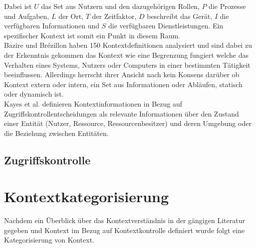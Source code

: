 Dabei ist $U$ das Set aus Nutzern und den dazugehörigen Rollen, $P$ die Prozesse und Aufgaben, $L$ der Ort, $T$ der Zeitfaktor, $D$ beschreibt das Gerät, $I$ die verfügbaren Informationen und $S$ die verfügbaren Dienstleistungen.
Ein spezifischer Kontext ist somit ein Punkt in diesem Raum.\\
Bazire und Brézillon \cite{hutchison_understanding_2005} haben 150 Kontextdefinitionen analysiert und sind dabei zu der Erkenntnis gekommen das Kontext wie eine Begrenzung fungiert welche das Verhalten eines Systems, Nutzers oder Computers in einer bestimmten Tätigkeit beeinflussen.
Allerdings herrscht ihrer Ansicht nach kein Konsens darüber ob Kontext extern oder intern, ein Set aus Informationen oder Abläufen, statisch oder dynamisch ist.\\

Kayes et al.\cite{kayes_icaf_2012} definieren Kontextinformationen in Bezug auf Zugriffskontrollentscheidungen als relevante Informationen über den Zustand einer Entität (Nutzer, Ressource, Ressourcenbesitzer) und deren Umgebung oder die Beziehung zwischen Entitäten.


\subsection{Zugriffskontrolle}
\section{Kontextkategorisierung}
Nachdem ein Überblick über das Kontextverständnis in der gängigen Literatur gegeben und Kontext im Bezug auf Kontextkontrolle definiert wurde folgt eine Kategorisierung von Kontext.
